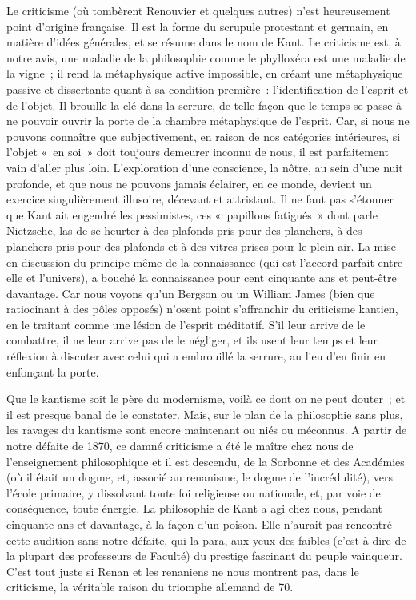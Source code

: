 \documentclass[french,twoside]{book} %
\begin{document}
Le criticisme (où tombèrent Renouvier et quelques autres) n’est heureusement point d’origine française. Il est la forme du scrupule protestant et germain, en matière d’idées générales, et se résume dans le nom de Kant. Le criticisme est, à notre avis, une maladie de la philosophie comme le phylloxéra est une maladie de la vigne ; il rend la métaphysique active impossible, en créant une métaphysique passive et dissertante quant à sa condition première : l’identification de l’esprit et de l’objet. Il brouille la clé dans la serrure, de telle façon que le temps se passe à ne pouvoir ouvrir la porte de la chambre métaphysique de l’esprit. Car, si nous ne pouvons connaître que subjectivement, en raison de nos catégories intérieures, si l’objet « en soi » doit toujours demeurer inconnu de nous, il est parfaitement vain d’aller plus loin. L’exploration d’une conscience, la nôtre, au sein d’une nuit profonde, et que nous ne pouvons jamais éclairer, en ce monde, devient un exercice singulièrement illusoire, décevant et attristant. Il ne faut pas s’étonner que Kant ait engendré les pessimistes, ces « papillons fatigués » dont parle Nietzsche, las de se heurter à des plafonds pris pour des planchers, à des planchers pris pour des plafonds et à des vitres prises pour le plein air. La mise en discussion du principe même de la connaissance (qui est l’accord parfait entre elle et l’univers), a bouché la connaissance pour cent cinquante ans et peut-être davantage. Car nous voyons qu’un Bergson ou un William James (bien que ratiocinant à des pôles opposés) n’osent point s’affranchir du criticisme kantien, en le traitant comme une lésion de l’esprit méditatif. S’il leur arrive de le combattre, il ne leur arrive pas de le négliger, et ils usent leur temps et leur réflexion à discuter avec celui qui a embrouillé la serrure, au lieu d’en finir en enfonçant la porte.\par
Que le kantisme soit le père du modernisme, voilà ce dont on ne peut douter ; et il est presque banal de le constater. Mais, sur le plan de la philosophie sans plus, les ravages du kantisme sont encore maintenant ou niés ou méconnus. A partir de notre défaite de 1870, ce damné criticisme a été le maître chez nous de l’enseignement philosophique et il est descendu, de la Sorbonne et des Académies (où il était un dogme, et, associé au renanisme, le dogme de l’incrédulité), vers l’école primaire, y dissolvant toute foi religieuse ou nationale, et, par voie de conséquence, toute énergie. La philosophie de Kant a agi chez nous, pendant cinquante ans et davantage, à la façon d’un poison. Elle n’aurait pas rencontré cette audition sans notre défaite, qui la para, aux yeux des faibles (c’est-à-dire de la plupart des professeurs de Faculté) du prestige fascinant du peuple vainqueur. C’est tout juste si Renan et les renaniens ne nous montrent pas, dans le criticisme, la véritable raison du triomphe allemand de 70.\par
\end{document}
